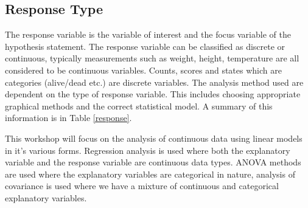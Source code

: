 \documentclass[a4paper, 10pt, fleqn, twosided]{memoir}
\begin{document}
\subsection{Response Type}

The response variable is the variable of interest and the focus variable of the
hypothesis statement. The response variable can be classified as discrete or
continuous, typically measurements such as weight, height, temperature are all
considered to be continuous variables. Counts, scores and states which are
categories (alive/dead etc.) are discrete variables. The analysis method used
are dependent on the type of response variable. This includes choosing
appropriate graphical methods and the correct statistical model. A summary of
this information is in Table \ref{response}.

This workshop will focus on the analysis of continuous data using linear models
in it's various forms. Regression analysis is used where both the explanatory
variable and the response variable are continuous data types. ANOVA methods are
used where the explanatory variables are categorical in nature, analysis of
covariance is used where we have a mixture of continuous and categorical
explanatory variables. \clearpage
\end{document}
